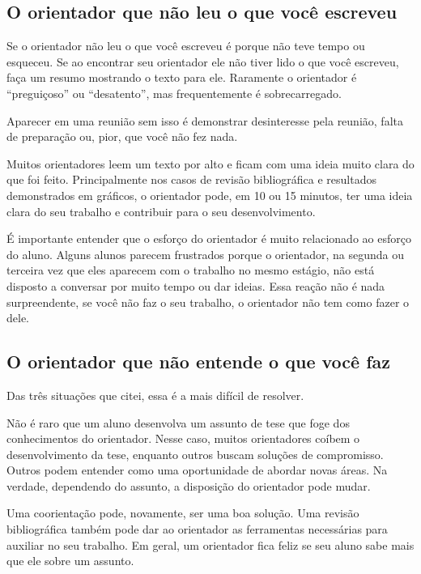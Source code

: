 \subsection{O orientador que não leu o que você escreveu}


Se o orientador não leu o que você escreveu é porque não teve tempo ou esqueceu. Se ao encontrar seu orientador ele não tiver lido o que você escreveu, faça um resumo mostrando o texto para ele. Raramente o orientador é ``preguiçoso'' ou ``desatento'', mas frequentemente é sobrecarregado. 




Aparecer em uma reunião sem isso é demonstrar desinteresse pela reunião, falta de preparação ou, pior, que você não fez nada.

Muitos orientadores leem um texto por alto e ficam com uma ideia muito clara do que foi feito. Principalmente nos casos de revisão bibliográfica e resultados demonstrados em gráficos, o orientador pode, em 10 ou 15 minutos, ter uma ideia clara do seu trabalho e contribuir para o seu desenvolvimento. 


É importante entender que o esforço do orientador é muito relacionado ao esforço do aluno. Alguns alunos parecem frustrados porque o orientador, na segunda ou terceira vez que eles aparecem com o trabalho no mesmo estágio, não está disposto a conversar por muito tempo ou dar ideias. Essa reação não é nada surpreendente, se você não faz o seu trabalho, o orientador não tem como fazer o dele.




\subsection{O orientador que não entende o que você faz}

Das três situações que citei, essa é a mais difícil de resolver.

Não é raro que um aluno desenvolva um assunto de tese que foge dos conhecimentos do orientador. Nesse caso, muitos orientadores coíbem o desenvolvimento da tese, enquanto outros buscam soluções de compromisso. Outros podem entender como uma oportunidade de abordar novas áreas. Na verdade, dependendo do assunto, a disposição do orientador pode mudar.

Uma coorientação pode, novamente, ser uma boa solução. Uma revisão bibliográfica também pode dar ao orientador as ferramentas necessárias para auxiliar no seu trabalho. Em geral, um orientador fica feliz se seu aluno sabe mais que ele sobre um assunto.


